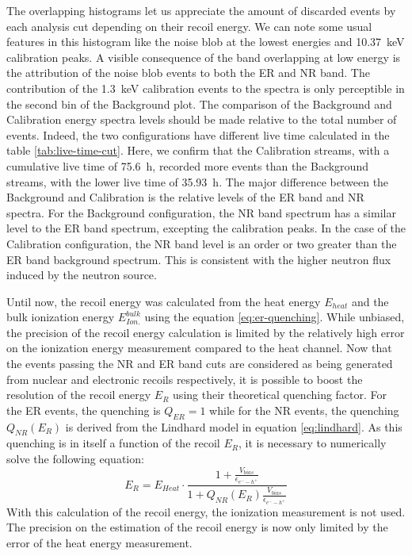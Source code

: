 The overlapping histograms let us appreciate the amount of discarded events by each analysis cut depending on their recoil energy. We can note some usual features in this histogram like the noise blob at the lowest energies and \SI{10.37}{\kilo\eV} calibration peaks. A visible consequence of the band overlapping at low energy is the attribution of the noise blob events to both the ER and NR band. The contribution of the \SI{1.3}{\kilo\eV} calibration events to the spectra is only perceptible in the second bin of the Background plot.
The comparison of the Background and Calibration energy spectra levels should be made relative to the total number of events. Indeed, the two configurations have different live time calculated in the table \ref{tab:live-time-cut}. Here, we confirm that the Calibration streams, with a cumulative live time of \SI{75.6}{\hour}, recorded more events than the Background streams, with the lower live time of \SI{35.93}{\hour}.
The major difference between the Background and Calibration is the relative levels of the ER band and NR spectra. For the Background configuration, the NR band spectrum has a similar level to the ER band spectrum, excepting the calibration peaks. In the case of the Calibration configuration, the NR band level is an order or two greater than the ER band background spectrum. This is consistent with the higher neutron flux induced by the neutron source.

Until now, the recoil energy was calculated from the heat energy $E_{heat}$ and the bulk ionization energy $E_{Ion.}^{bulk}$ using the equation \ref{eq:er-quenching}. While unbiased, the precision of the recoil energy calculation is limited by the relatively high error on the ionization energy measurement compared to the heat channel.
Now that the events passing the NR and ER band cuts are considered as being generated from nuclear and electronic recoils respectively, it is possible to boost the resolution of the recoil energy $E_R$ using their theoretical quenching factor. For the ER events, the quenching is $Q_{ER}=1$ while for the NR events, the quenching $Q_{NR} (E_R)$ is derived from the Lindhard model in equation \ref{eq:lindhard}. As this quenching is in itself a function of the recoil $E_R$, it is necessary to numerically solve the following equation:
\begin{equation}
\label{eq:er-from-heat}
E_R 
=
E_{Heat} 
\cdot
\frac{
1 + \frac{V_{bias}}{\epsilon_{e^--h^+}}
}{
1 + Q_{NR} \left( E_R \right)\frac{V_{bias}}{\epsilon_{e^--h^+}}
}
\end{equation}
With this calculation of the recoil energy, the ionization measurement is not used. The precision on the estimation of the recoil energy is now only limited by the error of the heat energy measurement.

